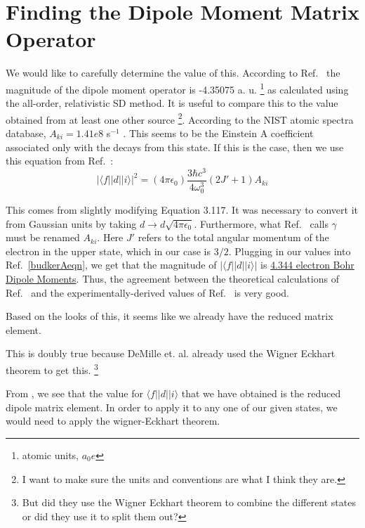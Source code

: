 \section{Finding the Dipole Moment Matrix Operator}
We would like to carefully determine the value of this. According to Ref.\ \cite{safronova2photon} the magnitude of the dipole moment operator is -4.35075 a. u. \footnote{atomic units, $a_0 e$} as calculated using the all-order, relativistic SD method. It is useful to compare this to the value obtained from at least one other source \footnote{I want to make sure the units and conventions are what I think they are.}. According to the NIST atomic spectra database, $A_{ki}=1.41e8$ s$^{-1}$ \cite{NISTasd}. This seems to be the Einstein A coefficient associated only with the decays from this state. If this is the case, then we use this equation from Ref.\ \cite{demilleBudkerKimball}:  
\begin{equation}
|\langle f ||d|| i \rangle|^2 = (4 \pi \epsilon_0) \frac{3 \hbar c^3}{4 \omega_0^3} (2 J'+1) A_{ki}\label{budkerAeqn} 
\end{equation}

This comes from slightly modifying Equation 3.117. It was necessary to convert it from Gaussian units by taking $d\rightarrow d \sqrt{4 \pi \epsilon_0}$. Furthermore, what Ref.\ \cite{demilleBudkerKimball} calls $\gamma$ must be renamed $A_{ki}$. Here $J'$ refers to the total angular momentum of the electron in the upper state, which in our case is $3/2$. Plugging in our values into Ref.\ \ref{budkerAeqn}, we get that the magnitude of $|\langle f ||d|| i \rangle|$ is \href{http://www.wolframalpha.com/input/?i=sqrt%283*hbar*c%5E3%2F%284*%282*pi*c%2F407.771+nm%29%5E3%29*4*pi*epsilon_0*4*1.41e8*1%2Fs%29}{4.344 electron Bohr Dipole Moments}.
Thus, the agreement between the theoretical calculations of Ref.\ \cite{safronova2photon} and the experimentally-derived values of Ref.\ \cite{NISTasd} is very good.  

Based on the looks of this, it seems like we already have the reduced matrix element. 


This is doubly true because DeMille et. al. already used the Wigner Eckhart theorem to get this. \footnote{But did they use the Wigner Eckhart theorem to combine the different states or did they use it to split them out?} 

From \cite{demilleBudkerKimball}, we see that the value for $\langle f||d||i\rangle$ that we have obtained is the reduced dipole matrix element. In order to apply it to any one of our given states, we would need to apply the wigner-Eckhart theorem. 

